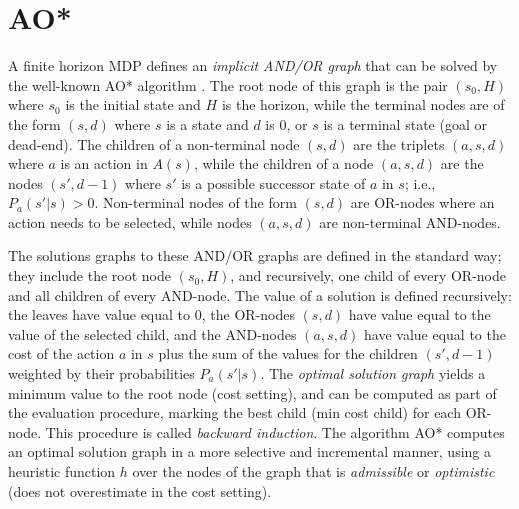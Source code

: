 \documentclass[letterpaper]{article}
\begin{document}
\section{AO*}

A finite horizon MDP defines an \emph{implicit AND/OR graph} that can be solved
by the well-known AO* algorithm \cite{nilsson:book}. The root node of this graph
is the pair $(s_0,H)$ where $s_0$ is the initial state and $H$ is the horizon,
while the terminal nodes are of the form $(s,d)$ where $s$ is a state and
$d$ is $0$, or $s$ is a terminal state (goal or dead-end).
The children of a non-terminal node $(s,d)$ are the triplets $(a,s,d)$ where $a$
is an action in $A(s)$, while the children of a node $(a,s,d)$ are the nodes
$(s',d-1)$ where $s'$ is a possible successor state of $a$ in $s$; i.e.,
$P_a(s'|s) > 0$.
Non-terminal nodes of the form $(s,d)$ are OR-nodes where an action needs to be
selected, while nodes %
$(a,s,d)$ are non-terminal AND-nodes.

The solutions graphs to these AND/OR graphs are defined in the standard way;
they include the root node $(s_0,H)$, and recursively, one child of every
OR-node and all children of every AND-node.
The value of a solution is defined recursively: the leaves have value equal to $0$, the OR-nodes $(s,d)$ have
value equal to the value of the selected child, and the AND-nodes $(a,s,d)$
have value equal to the cost of the action $a$ in $s$ plus the sum of
the values for the children $(s',d-1)$ weighted by their probabilities $P_a(s'|s)$.
The \emph{optimal solution graph} yields a minimum value to the root node (cost setting),
and can be computed as part of the evaluation procedure, marking the best child (min cost child)
for each OR-node.  This procedure is called \emph{backward induction}.
The algorithm AO* computes an optimal solution graph in a more selective and incremental
manner, using a heuristic function $h$ over the nodes of the graph that is \emph{admissible} or
\emph{optimistic} (does not overestimate in the cost setting).
\end{document}
